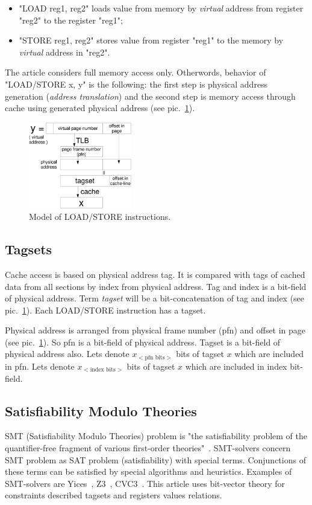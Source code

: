 \documentclass[times, 10pt,twocolumn]{article}
\begin{document}
\begin{itemize}
\item "LOAD reg1, reg2" loads value from memory by \emph{virtual}
address from register "reg2" to the register "reg1";
\item "STORE reg1, reg2" stores value from register "reg1" to the
memory by \emph{virtual} address in "reg2".
\end{itemize}

The article considers full memory access only. Otherwords, behavior
of "LOAD/STORE x, y" is the following: the first step is physical
address generation (\emph{address translation}) and the second step
is memory access through cache using generated physical address (see
pic.~\ref{LOAD}).

\begin{figure}[h]\label{LOAD}
\includegraphics[width=0.4\textwidth]{load}
\caption{Model of LOAD/STORE instructions.}
\end{figure} %

\subsection{Tagsets}

Cache access is based on physical address tag. It is compared with
tags of cached data from all sections by index from physical
address. Tag and index is a bit-field of physical address. Term
\emph{tagset} will be a bit-concatenation of tag and index (see
pic.~\ref{LOAD}). Each LOAD/STORE instruction has a tagset.

Physical address is arranged from physical frame number (pfn) and
offset in page (see pic.~\ref{LOAD}). So pfn is a bit-field of
physical address. Tagset is a bit-field of physical address also.
Lets denote $x_{<\mbox{pfn bits}>}$ bits of tagset $x$ which are
included in pfn. Lets denote $x_{<\mbox{index bits}>}$ bits of
tagset $x$ which are included in index bit-field.

\subsection{Satisfiability Modulo Theories}
SMT (Satisfiability Modulo Theories) problem is "the satisfiability
problem of the quantifier-free fragment of various first-order
theories"~\cite{SMT}. SMT-solvers concern SMT problem as SAT problem
(satisfiability) with special terms. Conjunctions of these terms can
be satisfied by special algorithms and heuristics. Examples of
SMT-solvers are Yices~\cite{Yices}, Z3~\cite{Z3}, CVC3~\cite{CVC3}.
This article uses bit-vector theory for constraints described
tagsets and registers values relations.
\end{document}
